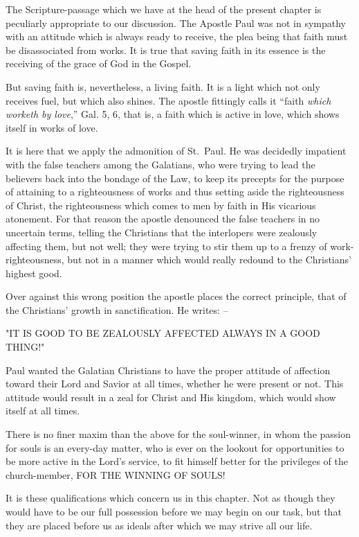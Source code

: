 \documentclass[
]{book}
\begin{document}
The Scripture-passage which we have at the head of the present chapter is peculiarly appropriate to our discussion. The Apostle Paul was not in sympathy with an attitude which is always ready to receive, the plea being that faith must be disassociated from works. It is true that saving faith in its essence is the receiving of the grace of God in the Gospel.

But saving faith is, nevertheless, a living faith. It is a light which not only receives fuel, but which also shines. The apostle fittingly calls it ``faith \emph{which worketh by love},'' Gal. 5, 6, that is, a faith which is active in love, which shows itself in works of love.

It is here that we apply the admonition of St.~Paul. He was decidedly impatient with the false teachers among the Galatians, who were trying to lead the believers back into the bondage of the Law, to keep its precepts for the purpose of attaining to a righteousness of works and thus setting aside the righteousness of Christ, the righteousness which comes to men by faith in His vicarious atonement. For that reason the apostle denounced the false teachers in no uncertain terms, telling the Christians that the interlopers were zealously affecting them, but not well; they were trying to stir them up to a frenzy of work-righteousness, but not in a manner which would really redound to the Christians' highest good.

Over against this wrong position the apostle places the correct principle, that of the Christians' growth in sanctification. He writes: --

\begin{center} "IT IS GOOD TO BE ZEALOUSLY AFFECTED ALWAYS IN A GOOD THING!" \end{center}

Paul wanted the Galatian Christians to have the proper attitude of affection toward their Lord and Savior at all times, whether he were present or not. This attitude would result in a zeal for Christ and His kingdom, which would show itself at all times.

There is no finer maxim than the above for the soul-winner, in whom the passion for souls is an every-day matter, who is ever on the lookout for opportunities to be more active in the Lord's service, to fit himself better for the privileges of the church-member, FOR THE WINNING OF SOULS!

It is these qualifications which concern us in this chapter. Not as though they would have to be our full possession before we may begin on our task, but that they are placed before us as ideals after which we may strive all our life.
\end{document}
